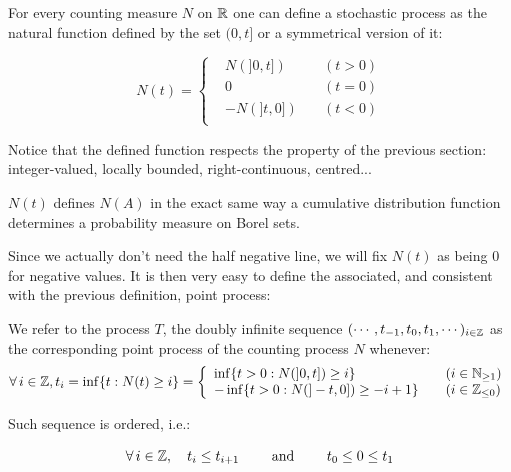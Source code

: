 \begin{definition}
For every counting measure $N$ on $\mathbb{R}$ one can define a stochastic process as the natural function defined by the set $(0,t]$ or a symmetrical version of it:

$$N(t) = \left\{
    \begin{array}{lll}
         &N \left ( ]0,t] \right ) \quad &(t > 0)  \\
         &0 \quad &(t= 0)   \\
         &- N \left ( ]t,0] \right ) \quad &(t < 0) \\
    \end{array}
\right. $$
\end{definition}


Notice that the defined function respects the property of the previous section: integer-valued, locally bounded, right-continuous, centred...

\begin{remarque}
$N(t)$ defines $N(A)$ in the exact same way a cumulative distribution function determines a probability measure on Borel sets.
\end{remarque}

Since we actually don't need the half negative line, we will fix $N(t)$ as being $0$ for negative values. It is then very easy to define the associated, and consistent with the previous definition, point process:

\begin{definition}
We refer to the process $T$, the doubly infinite sequence $( \cdots, t_{-1}, t_0, t_1, \cdots)_{i \in \mathbb{Z}}$ as the corresponding point process of the counting process $N$ whenever:
\begin{equation}
\forall i \in \Z, t_i = \inf \{ t : N(t) \geq i \} = \left\{
    \begin{array}{ll}
           \inf \{ t > 0 : N( ]0,t] ) \geq i \} \quad &( i \in \mathbb N_{\geq 1})  \\
          - \inf \{ t > 0 : N( ]-t, 0] ) \geq -i+1 \} \quad &(i \in \mathbb Z_{\leq 0}) \\
    \end{array}
\right. 
\end{equation}
\end{definition}

Such sequence is ordered, i.e.:

$$ \forall i \in \Z, \quad t_i \leq t_{i+1} \qquad \text{ and } \qquad t_0 \leq 0 \leq t_1 $$

